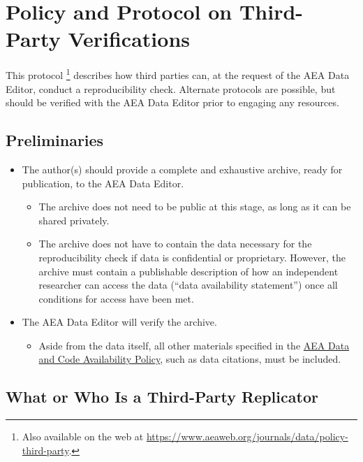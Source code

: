 \section{Policy and Protocol on Third-Party Verifications}\label{policy-and-protocol-on-third-party-verifications}

This protocol%
\footnote{Also available on the web at \url{https://www.aeaweb.org/journals/data/policy-third-party}.}
describes how third parties can, at the request of the AEA
Data Editor, conduct a reproducibility check. 
%
Alternate protocols are possible, but should be verified with the AEA
Data Editor prior to engaging any resources.

\subsection{Preliminaries}\label{preliminaries}

\begin{itemize}
\tightlist
\item
  The author(s) should provide a complete and exhaustive archive, ready
  for publication, to the AEA Data Editor.

  \begin{itemize}
  \tightlist
  \item
    The archive does not need to be public at this stage, as long as it
    can be shared privately.
  \item
    The archive does not have to contain the data necessary for the
    reproducibility check if data is confidential or proprietary.
    However, the archive must contain a publishable description of how
    an independent researcher can access the data (``data availability
    statement'') once all conditions for access have been met.
  \end{itemize}
\item
  The AEA Data Editor will verify the archive.

  \begin{itemize}
  \tightlist
  \item
    Aside from the data itself, all other materials specified in the
    \hyperref[data-and-code-availability-policy]{AEA Data and Code Availability Policy}, such as data
    citations, must be included.
  \end{itemize}
\end{itemize}

\subsection{What or Who Is a Third-Party
Replicator}\label{what-or-who-is-a-third-party-replicator}

